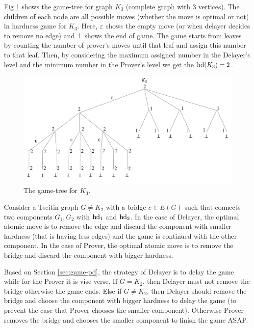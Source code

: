 \documentclass{report}
\begin{document}
\begin{examp}\label{exp:gg1}
Fig \ref{fig:gg1} shows the game-tree for graph $K_3$ (complete graph with 3 vertices). The children of each node are all possible moves (whether the move is optimal or not) in hardness game for $K_3$. Here, $\varepsilon $ shows the empty move (or when delayer decides to remove no edge) and $\bot$ shows the end of game. The game starts from leaves by counting the number of prover's moves until that leaf and assign this number to that leaf. Then, by considering the maximum assigned number in the Delayer's level and the minimum number in the Prover's level we get the $\operatorname{hd}(K_3)=2$.
   \begin{figure}
   \begin{center}
   \includegraphics[scale =0.45]{gg1.png}
   \caption{The game-tree for $K_3$.}
   \label{fig:gg1}
   \end{center}
   \end{figure}
\end{examp}

\begin{lem}\label{lem:tseitin-game-bridge}
Consider a Tseitin graph $G \not = K_2$ with a bridge $e \in E(G)$ such that connects two components $G_1,G_2$ with $\operatorname{hd}_1$ and $\operatorname{hd}_2$. In the case of Delayer, the optimal atomic move is to remove the edge and discard the component with smaller hardness (that is having less edges) and the game is continued with the other component. In the case of Prover, the optimal atomic move is to remove the bridge and discard the component with bigger hardness.
\end{lem}
\begin{prf}
Based on Section \ref{sec:game-pd}, the strategy of Delayer is to delay the game while for the Prover it is vise verse. If $G=K_2$, then Delayer must not remove the bridge otherwise the game ends. Else if $G \not = K_2$, then Delayer should remove the bridge and choose the component with bigger hardness to delay the game (to prevent the case that Prover chooses the smaller component). Otherwise Prover removes the bridge and chooses the smaller component to finish the game ASAP.
\end{prf}
\end{document}

